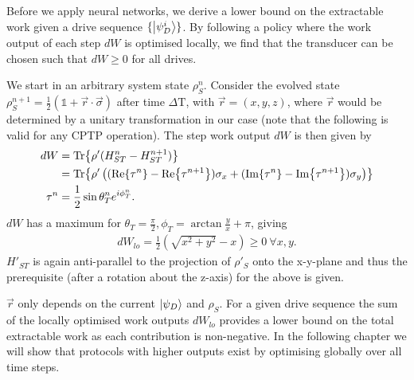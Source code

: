 \documentclass{article}
\begin{document}
Before we apply neural networks, we derive a lower bound on the extractable work given a drive sequence $\{\ket{\psi_D^i}\}$.
By following a policy where the work output of each step $dW$ is optimised locally, we find that the transducer can be chosen such that $dW \geq 0$ for all drives.

We start in an arbitrary system state $\rho_S^n$.
Consider the evolved state $\rho_S^{n+1} =\frac{1}{2} (\mathds{1} + \vec{r} \cdot \vec{\sigma})$ after time $\Delta \mathrm{T}$, with $\vec{r} = ( x, y, z )$, where $\vec{r}$ would be determined by a unitary transformation in our case (note that the following is valid for any CPTP operation). The step work output $dW$ is then given by
\begin{align*}
dW &= \Tr{\rho' (H_{ST}^{n} - H_{ST}^{n+1})} \\
&= \Tr{\rho' \left((\Re{\tau^n} - \Re{\tau^{n+1}}) \sigma_x + (\Im{\tau^n} - \Im{\tau^{n+1}} ) \sigma_y \right)} \\
\tau^n &= \frac{1}{2} \sin{\theta_T^n} e^{i\phi_T^n}. 
\end{align*}
$dW$ has a maximum for $\theta_T = \frac{\pi}{2}, \phi_T = \arctan{\frac{y}{x}} + \pi$, giving
\begin{align*}
dW_{lo} = \frac{1}{2}\left(\sqrt{x^2 + y^2} -x\right) \geq 0 \ \forall x, y.
\end{align*}
$H'_{ST}$ is again anti-parallel to the projection of $\rho'_S$ onto the x-y-plane and thus the prerequisite (after a rotation about the z-axis) for the above is given.

$\vec{r}$ only depends on the current $\ket{\psi_D}$ and $\rho_S$.
For a given drive sequence the sum of the locally optimised work outputs $dW_{lo}$ provides a lower bound on the total extractable work as each contribution is non-negative. In the following chapter we will show that protocols with higher outputs exist by optimising globally over all time steps.
\end{document}
